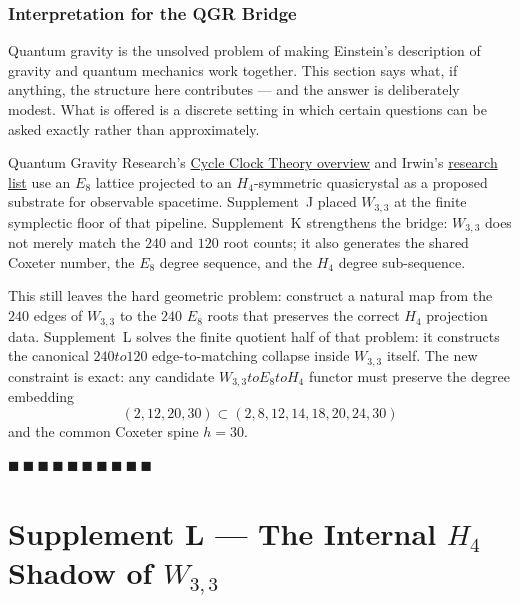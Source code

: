 \documentclass[12pt,a4paper]{article}
\def\to{ to }%
\theoremstyle{definition}
\begin{document}
\section*{Interpretation for the QGR Bridge}

\begin{plainbox}
Quantum gravity is the unsolved problem of making Einstein's description of gravity
and quantum mechanics work together. This section says what, if anything, the structure here
contributes --- and the answer is deliberately modest. What is offered is a discrete setting
in which certain questions can be asked exactly rather than approximately.
\end{plainbox}


Quantum Gravity Research's
\href{https://quantumgravityresearch.org/cycle-clock-theory-overview/}{Cycle Clock Theory overview}
and Irwin's
\href{https://kleeirwin.com/research/}{research list}
use an $E_8$ lattice projected to an $H_4$-symmetric quasicrystal as a
proposed substrate for observable spacetime. Supplement~J placed $W_{3,3}$ at the finite
symplectic floor of that pipeline. Supplement~K strengthens the bridge:
$W_{3,3}$ does not merely match the $240$ and $120$ root counts; it also
generates the shared Coxeter number, the $E_8$ degree sequence, and the
$H_4$ degree sub-sequence.

This still leaves the hard geometric problem: construct a natural map
from the $240$ edges of $W_{3,3}$ to the $240$ $E_8$ roots that preserves
the correct $H_4$ projection data. Supplement~L solves the finite
quotient half of that problem: it constructs the canonical $240\to 120$
edge-to-matching collapse inside $W_{3,3}$ itself. The new constraint is
exact: any candidate $W_{3,3}\to E_8\to H_4$ functor must preserve the
degree embedding
\[
(2,12,20,30)\subset(2,8,12,14,18,20,24,30)
\]
and the common Coxeter spine $h=30$.

\hfill $\blacksquare\ \blacksquare\ \blacksquare\ \blacksquare\ \blacksquare\ \blacksquare\ \blacksquare\ \blacksquare\ \blacksquare\ \blacksquare$

\clearpage
\part*{Supplement L --- The Internal $H_4$ Shadow of $W_{3,3}$}
\end{document}
